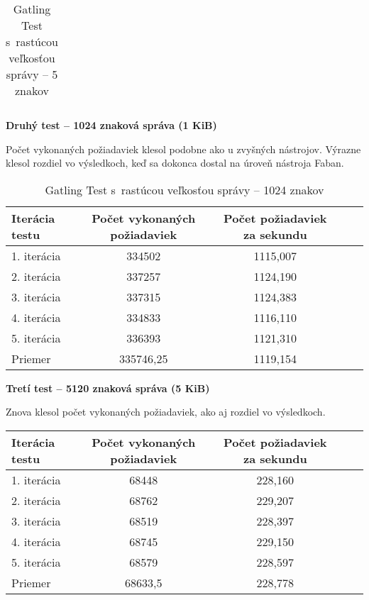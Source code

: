 \documentclass[12pt,oneside,final]{fithesis-utf8}
\begin{document}
\begin{itemize}
\begin{table}[H]
\begin{center}
\begin{tabular}{ | l | c | c | c | c |}
\end{tabular}
\end{center}
\caption{Gatling Test s~rastúcou veľkosťou správy -- 5 znakov}
\end{table}


\textbf{Druhý test -- 1024 znaková správa (1 KiB)}

Počet vykonaných požiadaviek klesol podobne ako u zvyšných nástrojov. Výrazne klesol rozdiel vo výsledkoch, keď sa dokonca dostal na úroveň nástroja Faban.

\begin{table}[H]
\begin{center}
\begin{tabular}{ | l | c | c | c | c |}
		\hline
		 \textbf{Iterácia testu} & \textbf{Počet vykonaných požiadaviek} & \textbf{Počet požiadaviek za sekundu} \\ \hline
		 1. iterácia & 334502 & 1115,007 \\ \hline
		 2. iterácia & 337257 & 1124,190 \\ \hline
		 3. iterácia & 337315 & 1124,383 \\ \hline
		 4. iterácia & 334833 & 1116,110 \\ \hline
		 5. iterácia & 336393 & 1121,310 \\ \hline
		 Priemer & 335746,25 & 1119,154 \\ \hline
		 
\end{tabular}
\end{center}
\caption{Gatling Test s~rastúcou veľkosťou správy -- 1024 znakov}
\end{table}


\textbf{Tretí test -- 5120 znaková správa (5 KiB)}

Znova klesol počet vykonaných požiadaviek, ako aj rozdiel vo výsledkoch.

\begin{table}[H]
\begin{center}
\begin{tabular}{ | l | c | c | c | c |}
		\hline
		 \textbf{Iterácia testu} & \textbf{Počet vykonaných požiadaviek} & \textbf{Počet požiadaviek za sekundu} \\ \hline
		 1. iterácia & 68448 & 228,160 \\ \hline
		 2. iterácia & 68762 & 229,207 \\ \hline
		 3. iterácia & 68519 & 228,397 \\ \hline
		 4. iterácia & 68745 & 229,150 \\ \hline
		 5. iterácia & 68579 & 228,597 \\ \hline
		 Priemer & 68633,5 & 228,778 \\ \hline
		 

\end{tabular}
\end{center}
\end{table}
\end{itemize}
\end{document}
